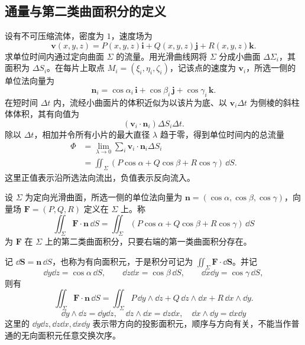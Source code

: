 \subsection*{通量与第二类曲面积分的定义}
设有不可压缩流体，密度为 $1$，速度场为
\[
\boldsymbol v(x,y,z)=P(x,y,z)\boldsymbol i+Q(x,y,z)\boldsymbol j+R(x,y,z)\boldsymbol k.
\]
求单位时间内通过定向曲面 $\Sigma$ 的流量。用光滑曲线网将 $\Sigma$ 分成小曲面 $\Delta\Sigma_i$，其面积为 $\Delta S_i$。在每片上取点 $M_i=(\xi_i,\eta_i,\zeta_i)$，记该点的速度为 $\boldsymbol v_i$，所选一侧的单位法向量为
\[
\boldsymbol n_i=\cos\alpha_i\,\boldsymbol i+\cos\beta_i\,\boldsymbol j+\cos\gamma_i\,\boldsymbol k.
\]
在短时间 $\Delta t$ 内，流经小曲面片的体积近似为以该片为底、以 $\boldsymbol v_i\Delta t$ 为侧棱的斜柱体体积，其有向值为
\[
(\boldsymbol v_i\cdot\boldsymbol n_i)\Delta S_i\Delta t.
\]
除以 $\Delta t$，相加并令所有小片的最大直径 $\lambda$ 趋于零，得到单位时间内的总流量
\begin{align*}
\Phi
&=\lim_{\lambda\to0}\sum_i\boldsymbol v_i\cdot\boldsymbol n_i\Delta S_i\\
&=\displaystyle\iint_\Sigma(P\cos\alpha+Q\cos\beta+R\cos\gamma)\,\dd S.
\end{align*}
这里正值表示沿所选法向流出，负值表示反向流入。

\begin{definition}
设 $\Sigma$ 为定向光滑曲面，所选一侧的单位法向量为 $\boldsymbol n=(\cos\alpha,\cos\beta,\cos\gamma)$，向量场 $\boldsymbol F=(P,Q,R)$ 定义在 $\Sigma$ 上。称
\[
\displaystyle\iint_\Sigma\boldsymbol F\cdot\boldsymbol n\,\dd S
=\displaystyle\iint_\Sigma(P\cos\alpha+Q\cos\beta+R\cos\gamma)\,\dd S
\]
为 $\boldsymbol F$ 在 $\Sigma$ 上的第二类曲面积分，只要右端的第一类曲面积分存在。
\end{definition}
记 $\dd\boldsymbol S=\boldsymbol n\,\dd S$，也称为有向面积元，于是积分可记为 $\displaystyle\iint_\Sigma\boldsymbol F\cdot\dd\boldsymbol S$。并记
\[
\dd y\dd z=\cos\alpha\,\dd S,\qquad
\dd z\dd x=\cos\beta\,\dd S,\qquad
\dd x\dd y=\cos\gamma\,\dd S,
\]
则有
\[
\displaystyle\iint_\Sigma\boldsymbol F\cdot\boldsymbol n\,\dd S
=\displaystyle\iint_\Sigma P\,\dd y\wedge\dd z+Q\,\dd z\wedge\dd x+R\,\dd x\wedge\dd y.
\]
\[\dd y\wedge\dd z= \dd y\dd z,\quad   \dd z\wedge\dd x= \dd z\dd x,\quad  \dd x\wedge\dd y=\dd x\dd y\]
这里的 $\dd y\dd z,\dd z\dd x,\dd x\dd y$ 表示带方向的投影面积元，顺序与方向有关，不能当作普通的无向面积元任意交换次序。

